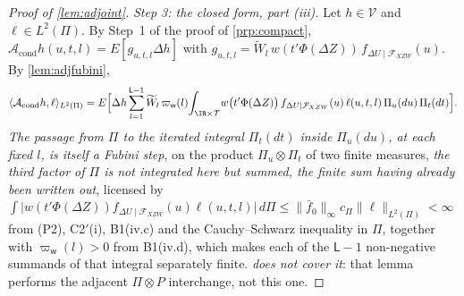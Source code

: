 \begin{proof}[Proof of \cref{lem:adjoint}]
\emph{Step 3: the closed form, part (iii).}
Let $h\in\mathcal V$ and $\ell\in L^{2}(\Pi)$. By Step~1 of the proof of \cref{prp:compact},
$\mathcal A_{\mathrm{cond}}h(u,t,l)=E[g_{u,t,l}\Delta h]$ with
$g_{u,t,l}=\widetilde W_l\,w(t'\Phi(\Delta Z))\,f_{\Delta U\mid\mathcal F_{XZW}}(u)$. By
\cref{lem:adjfubini},
\begin{equation}\label{eq:adjstep}
\langle\mathcal A_{\mathrm{cond}}h,\ell\rangle_{L^{2}(\Pi)}
=E\Big[\Delta h\sum_{l=1}^{\mathsf L-1}\widetilde W_l\,\varpi_{\mathsf w}(l)\!\int_{\IR\times\mathcal T}\!w\big(t'\Phi(\Delta Z)\big)\,f_{\Delta U\mid\mathcal F_{XZW}}(u)\,\ell(u,t,l)\,\Pi_u(du)\,\Pi_t(dt)\Big].
\end{equation}
\emph{The passage from $\Pi$ to the iterated integral $\Pi_t(dt)$ inside $\Pi_u(du)$, at each fixed $l$,
is itself a
Fubini step}, on the product $\Pi_u\otimes\Pi_t$ of two finite measures, \emph{the third factor of
$\Pi$ is not integrated here but summed, the finite sum having already been written out}, licensed by
$\int\big|w(t'\Phi(\Delta Z))f_{\Delta U\mid\mathcal F_{XZW}}(u)\ell(u,t,l)\big|\,d\Pi\le\|\bar f_0\|_\infty c_\Pi\|\ell\|_{L^{2}(\Pi)}<\infty$
from (P2), C2$'$(i), B1(iv.c) and the Cauchy--Schwarz inequality in $\Pi$, together with
$\varpi_{\mathsf w}(l)>0$ from B1(iv.d), which makes each of the $\mathsf L-1$ non-negative summands of
that integral separately finite. \emph{
does not cover it}: that lemma performs the adjacent $\Pi\otimes P$ interchange, not this one.


\end{proof}
